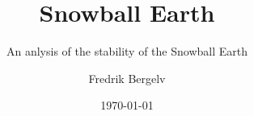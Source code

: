 
\title{Snowball Earth}

\subtitle{An anlysis of the stability of the Snowball Earth}

\author{Fredrik Bergelv}

\date{\today}

\newcommand{\IncludeBib}{y} 
